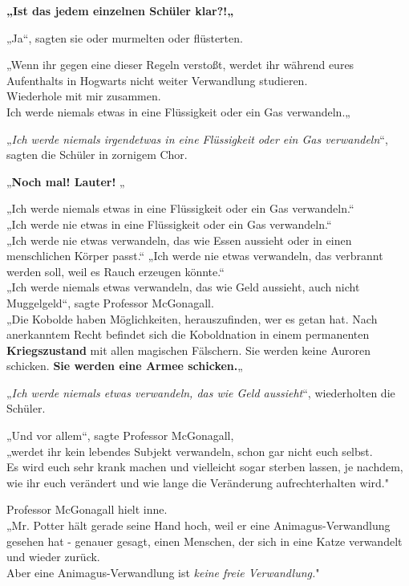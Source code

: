 {\textbf{„Ist das jedem einzelnen Schüler klar?!„}

„Ja“, sagten sie oder murmelten oder flüsterten.

„Wenn ihr gegen eine dieser Regeln verstoßt, werdet ihr während eures Aufenthalts in Hogwarts nicht weiter Verwandlung studieren.\\ Wiederhole mit mir zusammen.\\ Ich werde niemals etwas in eine Flüssigkeit oder ein Gas verwandeln.„

„\emph{Ich werde niemals irgendetwas in eine Flüssigkeit oder ein Gas verwandeln}“, sagten die Schüler in zornigem Chor.

„\textbf{Noch mal! Lauter!} „

„Ich werde niemals etwas in eine Flüssigkeit oder ein Gas verwandeln.“\\ „Ich werde nie etwas in eine Flüssigkeit oder ein Gas verwandeln.“\\ „Ich werde nie etwas verwandeln, das wie Essen aussieht oder in einen menschlichen Körper passt.“ „Ich werde nie etwas verwandeln, das verbrannt werden soll, weil es Rauch erzeugen könnte.“\\ „Ich werde niemals etwas verwandeln, das wie Geld aussieht, auch nicht Muggelgeld“, sagte Professor McGonagall.\\ „Die Kobolde haben Möglichkeiten, herauszufinden, wer es getan hat. Nach anerkanntem Recht befindet sich die Koboldnation in einem permanenten \textbf{Kriegszustand} mit allen magischen Fälschern. Sie werden keine Auroren schicken. \textbf{Sie werden eine Armee schicken.}„

„\emph{Ich werde niemals etwas verwandeln, das wie Geld aussieht}“, wiederholten die Schüler.

„Und vor allem“, sagte Professor McGonagall,\\ „werdet ihr kein lebendes Subjekt verwandeln, schon gar nicht euch selbst.\\ Es wird euch sehr krank machen und vielleicht sogar sterben lassen, je nachdem, wie ihr euch verändert und wie lange die Veränderung aufrechterhalten wird."

Professor McGonagall hielt inne.\\ „Mr. Potter hält gerade seine Hand hoch, weil er eine Animagus-Verwandlung gesehen hat - genauer gesagt, einen Menschen, der sich in eine Katze verwandelt und wieder zurück.\\ Aber eine Animagus-Verwandlung ist \emph{keine freie Verwandlung.}"

}
